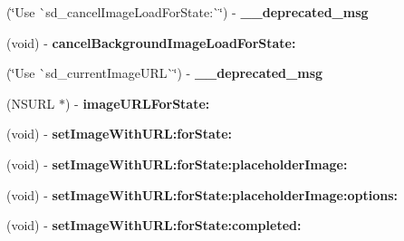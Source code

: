 \begin{DoxyCompactItemize}
\item 
\mbox{\label{category_u_i_button_07_web_cache_deprecated_08_ac9c0b556cb6bb0fbc754731fc11cda71}} 
(\char`\"{}Use \`{}sd\+\_\+cancel\+Image\+Load\+For\+State\+:\`{}\char`\"{}) -\/ {\bfseries \+\_\+\+\_\+deprecated\+\_\+msg}
\item 
\mbox{\label{category_u_i_button_07_web_cache_deprecated_08_a9d1a17c9dd04afddb7e71ab0b5de3742}} 
(void) -\/ {\bfseries cancel\+Background\+Image\+Load\+For\+State\+:}
\item 
\mbox{\label{category_u_i_button_07_web_cache_deprecated_08_a9abef11d7c09d7ab93a5e9bf531e3311}} 
(\char`\"{}Use \`{}sd\+\_\+current\+Image\+U\+RL\`{}\char`\"{}) -\/ {\bfseries \+\_\+\+\_\+deprecated\+\_\+msg}
\item 
\mbox{\label{category_u_i_button_07_web_cache_deprecated_08_a6ead91154847e0ebb1a993442b3b06c8}} 
(N\+S\+U\+RL $\ast$) -\/ {\bfseries image\+U\+R\+L\+For\+State\+:}
\item 
\mbox{\label{category_u_i_button_07_web_cache_deprecated_08_aa6120dbf869e6fe383ec2f46beb4e9c7}} 
(void) -\/ {\bfseries set\+Image\+With\+U\+R\+L\+:for\+State\+:}
\item 
\mbox{\label{category_u_i_button_07_web_cache_deprecated_08_a55ba1d03ef9670bfe0c81377272a204e}} 
(void) -\/ {\bfseries set\+Image\+With\+U\+R\+L\+:for\+State\+:placeholder\+Image\+:}
\item 
\mbox{\label{category_u_i_button_07_web_cache_deprecated_08_a6889b9b882c09274db7401a36ada5a82}} 
(void) -\/ {\bfseries set\+Image\+With\+U\+R\+L\+:for\+State\+:placeholder\+Image\+:options\+:}
\item 
\mbox{\label{category_u_i_button_07_web_cache_deprecated_08_a642e0c31ee4bf21d06d50aadefe92290}} 
(void) -\/ {\bfseries set\+Image\+With\+U\+R\+L\+:for\+State\+:completed\+:}

\end{DoxyCompactItemize}

